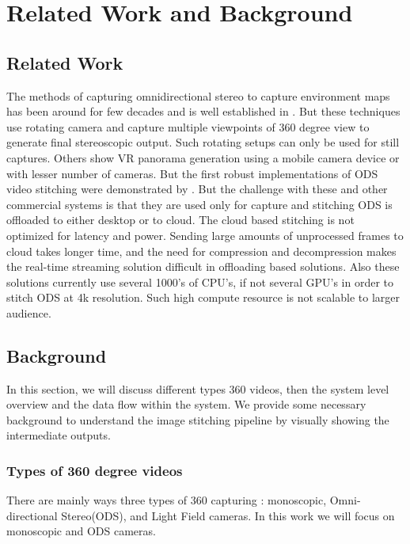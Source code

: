 \chapter{Related Work and Background}

\section{Related Work}
The methods of capturing omnidirectional stereo to capture environment maps has been around for few decades and is well established in \cite{peleg2001omnistereo, kang2000geometry, ishiguro1990omni}. But these techniques use rotating camera and capture multiple viewpoints of 360 degree view to generate final stereoscopic output. Such rotating setups can only be used for still captures. Others \cite{richardt2013megastereo,ho2017dual} show VR panorama generation using a mobile camera device or with lesser number of cameras. But the first robust implementations of ODS video stitching were demonstrated by \cite{richardt2017video,fbSurround360}. But the challenge with these and other commercial systems is that they are used only for capture and stitching ODS is offloaded to either desktop or to cloud. The cloud based stitching is not optimized for latency and power. Sending large amounts of unprocessed frames to cloud takes longer time, and the need for compression and decompression makes the real-time streaming solution difficult in offloading based solutions. Also these solutions currently use several 1000's of CPU's, if not several GPU's in order to stitch ODS at 4k resolution. Such high compute resource is not scalable to larger audience. 

\section{Background}
In this section, we will discuss different types 360 videos, then the system level overview and the data flow within the system. We provide some necessary background to understand the image stitching pipeline by visually showing the intermediate outputs. 

\subsection{Types of 360 degree videos}
There are mainly ways three types of 360 capturing : monoscopic, Omni-directional Stereo(ODS), and Light Field cameras. In this work we will focus on monoscopic and ODS cameras. 
